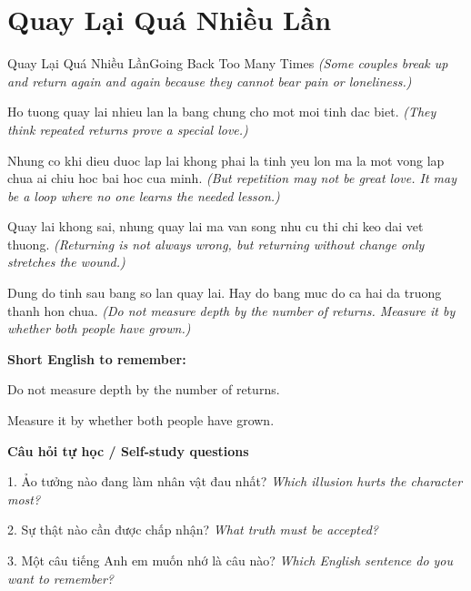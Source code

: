 \section{Quay Lại Quá Nhiều Lần}
\begin{truyen}{Quay Lại Quá Nhiều Lần}{Going Back Too Many Times}
\textit{(Some couples break up and return again and again because they cannot bear pain or loneliness.)}

Ho tuong quay lai nhieu lan la bang chung cho mot moi tinh dac biet.
\textit{(They think repeated returns prove a special love.)}

Nhung co khi dieu duoc lap lai khong phai la tinh yeu lon ma la mot vong lap chua ai chiu hoc bai hoc cua minh.
\textit{(But repetition may not be great love. It may be a loop where no one learns the needed lesson.)}

Quay lai khong sai, nhung quay lai ma van song nhu cu thi chi keo dai vet thuong.
\textit{(Returning is not always wrong, but returning without change only stretches the wound.)}

\end{truyen}

\begin{baihoc}
Dung do tinh sau bang so lan quay lai. Hay do bang muc do ca hai da truong thanh hon chua.
\textit{(Do not measure depth by the number of returns. Measure it by whether both people have grown.)}
\end{baihoc}

\begin{ghinhoanh}
\textbf{Short English to remember:}

Do not measure depth by the number of returns.

Measure it by whether both people have grown.

\end{ghinhoanh}

\begin{tuhocnhanh}
\textbf{Câu hỏi tự học / Self-study questions}

1. Ảo tưởng nào đang làm nhân vật đau nhất? \textit{Which illusion hurts the character most?}

2. Sự thật nào cần được chấp nhận? \textit{What truth must be accepted?}

3. Một câu tiếng Anh em muốn nhớ là câu nào? \textit{Which English sentence do you want to remember?}
\end{tuhocnhanh}
\ngancach

